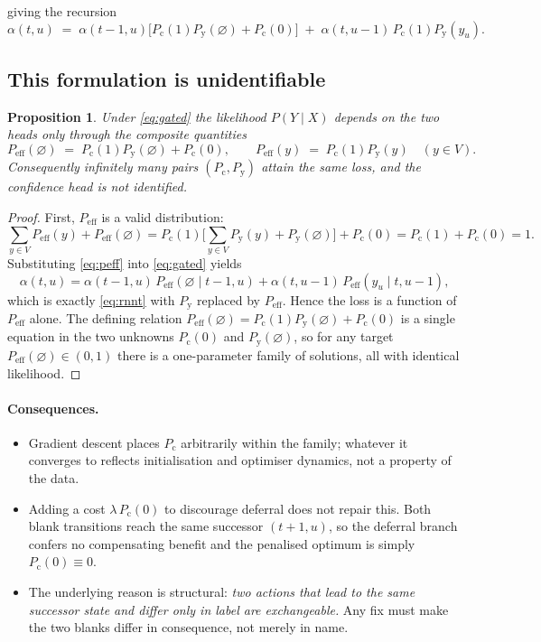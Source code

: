 \documentclass[11pt]{article}
\newtheorem{proposition}{Proposition}
\newcommand{\blank}{\varnothing}
\newcommand{\Py}{P_{\mathrm{y}}}
\newcommand{\Pc}{P_{\mathrm{c}}}
\newcommand{\Peff}{P_{\mathrm{eff}}}
\begin{document}
\noindent giving the recursion
\begin{equation}
  \alpha(t,u) \;=\; \alpha(t-1,u)\big[\Pc(1)\Py(\blank) + \Pc(0)\big]
                 \;+\; \alpha(t,u-1)\,\Pc(1)\Py(y_u).
  \label{eq:gated}
\end{equation}

\subsection{This formulation is unidentifiable}

\begin{proposition}
Under \eqref{eq:gated} the likelihood $P(Y \mid X)$ depends on the two heads only
through the composite quantities
\begin{equation}
  \Peff(\blank) \;=\; \Pc(1)\Py(\blank) + \Pc(0),
  \qquad
  \Peff(y) \;=\; \Pc(1)\Py(y) \quad (y \in V).
  \label{eq:peff}
\end{equation}
Consequently infinitely many pairs $(\Pc,\Py)$ attain the same loss, and the
confidence head is not identified.
\end{proposition}

\begin{proof}
First, $\Peff$ is a valid distribution:
\[
  \sum_{y \in V}\Peff(y) + \Peff(\blank)
  = \Pc(1)\Big[\sum_{y\in V}\Py(y) + \Py(\blank)\Big] + \Pc(0)
  = \Pc(1) + \Pc(0) = 1 .
\]
Substituting \eqref{eq:peff} into \eqref{eq:gated} yields
\[
  \alpha(t,u) = \alpha(t-1,u)\,\Peff(\blank \mid t-1,u)
              + \alpha(t,u-1)\,\Peff(y_u \mid t,u-1),
\]
which is exactly \eqref{eq:rnnt} with $\Py$ replaced by $\Peff$. Hence the loss is
a function of $\Peff$ alone. The defining relation
$\Peff(\blank) = \Pc(1)\Py(\blank) + \Pc(0)$ is a single equation in the two
unknowns $\Pc(0)$ and $\Py(\blank)$, so for any target $\Peff(\blank) \in (0,1)$
there is a one-parameter family of solutions, all with identical likelihood.
\end{proof}

\paragraph{Consequences.}
\begin{itemize}
  \item Gradient descent places $\Pc$ arbitrarily within the family; whatever it
        converges to reflects initialisation and optimiser dynamics, not a
        property of the data.
  \item Adding a cost $\lambda\,\Pc(0)$ to discourage deferral does not repair
        this. Both blank transitions reach the same successor $(t+1,u)$, so the
        deferral branch confers no compensating benefit and the penalised
        optimum is simply $\Pc(0) \equiv 0$.
  \item The underlying reason is structural: \emph{two actions that lead to the
        same successor state and differ only in label are exchangeable.} Any fix
        must make the two blanks differ in consequence, not merely in name.
\end{itemize}
\end{document}
